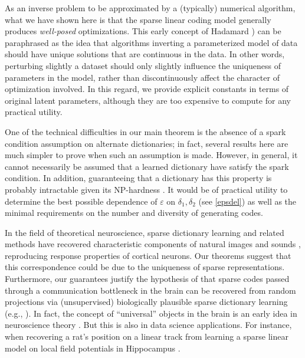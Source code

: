 \documentclass[9pt,twocolumn]{pnas-new}
\begin{document}
As an inverse problem to be approximated by a (typically) numerical algorithm, what we have shown here is that the sparse linear coding model  generally produces \textit{well-posed} optimizations.  This early concept of Hadamard \cite{Hadamard1902}) can be paraphrased as the idea that algorithms inverting a parameterized model of data should have unique solutions that are continuous in the data.  In other words, perturbing slightly a dataset should only slightly influence the uniqueness of parameters in the model, rather than discontinuously affect the character of optimization involved.  In this regard, we provide explicit constants in terms of original latent parameters, although they are too expensive to compute for any practical utility.    %

One of the technical difficulties in our main theorem is the absence of a spark condition assumption on alternate dictionaries; in fact, several results here are much simpler to prove when such an assumption is made.  However, in general, it cannot necessarily be assumed that a learned dictionary have satisfy the spark condition.  In addition, guaranteeing that a dictionary has this property is probably intractable given its NP-hardness \cite{tillmann2014computational}.  It would be of practical utility to determine the best possible dependence of $\varepsilon$ on $\delta_1, \delta_2$ (see \eqref{epsdel}) as well as the minimal requirements on the number and diversity of generating codes. %

In the field of theoretical neuroscience, sparse dictionary learning and related methods have recovered characteristic components of natural images and sounds \cite{bellsejnowski1996, smithlewicki2006, Carlson12}, reproducing response properties of cortical neurons. Our theorems suggest that this correspondence could be due to the uniqueness of sparse representations. Furthermore, our guarantees justify the hypothesis of \cite{Coulter10, Isely10} that sparse codes passed through a communication bottleneck in the brain can be recovered from random projections via (unsupervised) biologically plausible sparse dictionary learning (e.g., \cite{rehnsommer2007, rozell2007neurally, hu2014hebbian}).  In fact, the concept of ``universal'' objects in the brain is an early idea in neuroscience theory \cite{pitts1947}. But this is also in data science applications.  For instance, when recovering a rat's position on a linear track from learning a sparse linear model on  local field potentials in Hippocampus \cite{Agarwal14}.
\end{document}
